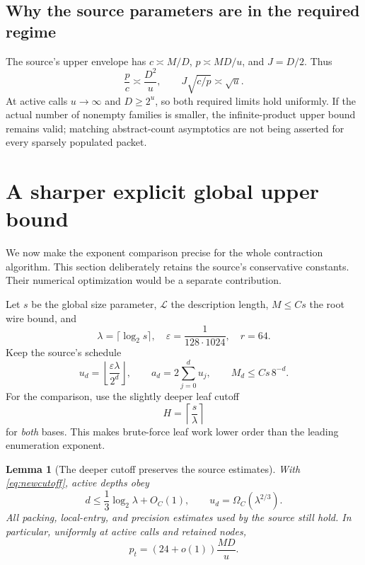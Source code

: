 \documentclass[11pt]{article}
\newtheorem{lemma}[theorem]{Lemma}
\theoremstyle{remark}
\begin{document}
\subsection{Why the source parameters are in the required regime}

The source's upper envelope has $c\asymp M/D$, $p\asymp MD/u$, and $J=D/2$. Thus
\[
 \frac pc\asymp\frac{D^2}{u},\qquad
 J\sqrt{c/p}\asymp\sqrt u.
\]
At active calls $u\to\infty$ and $D\ge2^u$, so both required limits hold uniformly. If the actual number of nonempty families is smaller, the infinite-product upper bound remains valid; matching abstract-count asymptotics are not being asserted for every sparsely populated packet.

\section{A sharper explicit global upper bound}\label{sec:global}

We now make the exponent comparison precise for the whole contraction algorithm. This section deliberately retains the source's conservative constants. Their numerical optimization would be a separate contribution.

Let $s$ be the global size parameter, $\mathcal L$ the description length, $M\le Cs$ the root wire bound, and
\[
 \lambda=\lceil\log_2s\rceil,\quad
 \varepsilon=\frac1{128\cdot1024},\quad r=64.
\]
Keep the source's schedule
\[
 u_d=\left\lfloor\frac{\varepsilon\lambda}{2^d}\right\rfloor,
 \qquad a_d=2\sum_{j=0}^d u_j,
 \qquad M_d\le Cs\,8^{-d}.
\]
For the comparison, use the slightly deeper leaf cutoff
\begin{equation}\label{eq:newcutoff}
 H=\left\lceil\frac{s}{\lambda}\right\rceil
\end{equation}
for \emph{both} bases. This makes brute-force leaf work lower order than the leading enumeration exponent.

\begin{lemma}[The deeper cutoff preserves the source estimates]\label{lem:cutoff}
With \eqref{eq:newcutoff}, active depths obey
\[
 d\le\frac13\log_2\lambda+O_C(1),\qquad
 u_d=\Omega_C(\lambda^{2/3}).
\]
All packing, local-entry, and precision estimates used by the source still hold. In particular, uniformly at active calls and retained nodes,
\begin{equation}\label{eq:sharp-precision}
 p_t=(24+o(1))\frac{MD}{u}.
\end{equation}
\end{lemma}
\end{document}
